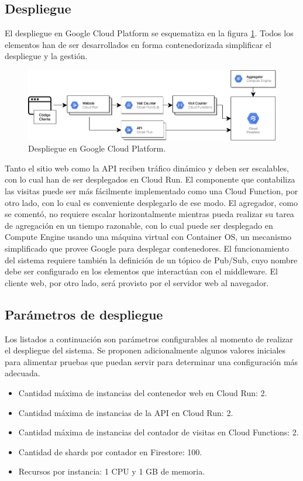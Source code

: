 \documentclass[11pt]{scrartcl}
\begin{document}
\subsection{Despliegue}

El despliegue en Google Cloud Platform se esquematiza en la figura \ref{fig:deployment}.  Todos los elementos han de ser desarrollados en forma contenedorizada simplificar el despliegue y la gestión.

\begin{figure}
\centering
\includegraphics[scale=0.48]{img/deployment}
\caption{Despliegue en Google Cloud Platform.}
\label{fig:deployment}
\end{figure}

Tanto el sitio web como la API reciben tráfico dinámico y deben ser escalables, con lo cual han de ser desplegados en Cloud Run. El componente que contabiliza las visitas puede ser más fácilmente implementado como una Cloud Function, por otro lado, con lo cual es conveniente desplegarlo de ese modo. El agregador, como se comentó, no requiere escalar horizontalmente mientras pueda realizar su tarea de agregación en un tiempo razonable, con lo cual puede ser desplegado en Compute Engine usando una máquina virtual con Container OS, un mecanismo simplificado que provee Google para desplegar contenedores. El funcionamiento del sistema requiere también la definición de un tópico de Pub/Sub, cuyo nombre debe ser configurado en los elementos que interactúan con el middleware. El cliente web, por otro lado, será provisto por el servidor web al navegador.

\subsection{Parámetros de despliegue}

Los listados a continuación son parámetros configurables al momento de realizar el despliegue del sistema. Se proponen adicionalmente algunos valores iniciales para alimentar pruebas que puedan servir para determinar una configuración más adecuada.

\begin{itemize}
\item Cantidad máxima de instancias del contenedor web en Cloud Run: 2.
\item Cantidad máxima de instancias de la API en Cloud Run: 2.
\item Cantidad máxima de instancias del contador de visitas en Cloud Functions: 2.
\item Cantidad de shards por contador en Firestore: 100.
\item Recursos por instancia: 1 CPU y 1 GB de memoria.
\end{itemize}
\end{document}
